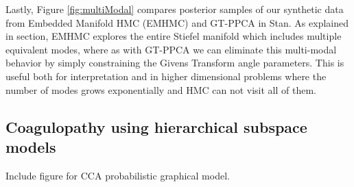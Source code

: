 \documentclass{article}
\begin{document}
Lastly, Figure \ref{fig:multiModal} compares posterior samples of our synthetic data from Embedded Manifold HMC (EMHMC) and GT-PPCA in Stan. As explained in section, EMHMC explores the entire Stiefel manifold which includes multiple equivalent modes, where as with GT-PPCA we can eliminate this multi-modal behavior by simply constraining the Givens Transform angle parameters. This is useful both for interpretation and in higher dimensional problems where the number of modes grows exponentially and HMC can not visit all of them. 


\subsection{Coagulopathy using hierarchical subspace models}
Include figure for CCA probabilistic graphical model.
\end{document}
